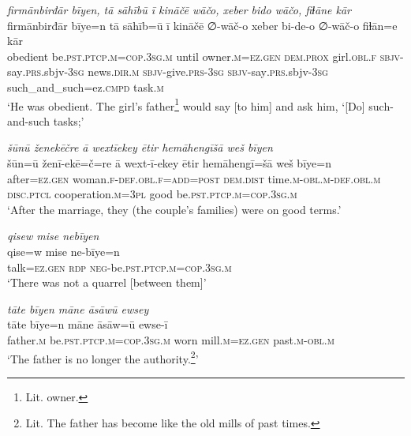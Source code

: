 \ea \label{RE.18}
\textit{firmānbirđār bīyen, tā sāhībū ī kināčē wāčo, xeber bido wāčo, fiɫāne kār} \\ 
\gll firmānbirđār bīye=n tā sāhīb=ū ī kināčē ∅-wāč-o xeber bi-de-o ∅-wāč-o fiɫān=e kār \\ 
 obedient be\textsc{.pst}\textsc{.ptcp}\textsc{.m}\textsc{=cop}\textsc{.3sg}\textsc{.m} until owner\textsc{.m}\textsc{=ez.gen} \textsc{dem.prox} girl\textsc{.obl}\textsc{.f} \textsc{sbjv-}say\textsc{.prs}.sbjv\textsc{-3sg} news\textsc{.dir}\textsc{.m} \textsc{sbjv-}give\textsc{.prs}\textsc{-3sg} \textsc{sbjv-}say\textsc{.prs}.sbjv\textsc{-3sg} such\_and\_such=ez\textsc{.cmpd} task\textsc{.m} \\ 
\glt `He was obedient. The girl’s father\footnote{Lit. owner.} would say [to him] and ask him, ‘[Do] such-and-such tasks;'
\z 
 
\ea \label{RE.22}
\textit{šūnū ženekēčre ā wextīekey ētir hemāhengīšā weš bīyen} \\ 
\gll šūn=ū ženī-ekē=č=re ā wext-ī-ekey ētir hemāhengī=šā weš bīye=n \\ 
 after\textsc{=ez.gen} woman\textsc{.f}\textsc{-def}\textsc{.obl}\textsc{.f}\textsc{=add}\textsc{=\textsc{post}} \textsc{dem.dist} time\textsc{.m}\textsc{-obl}\textsc{.m}\textsc{-def}\textsc{.obl}\textsc{.m} \textsc{disc.ptcl} cooperation\textsc{.m}\textsc{=3pl} good be\textsc{.pst}\textsc{.ptcp}\textsc{.m}\textsc{=cop}\textsc{.3sg}\textsc{.m} \\ 
\glt `After the marriage, they (the couple's families) were on good terms.'
\z 
 
\ea \label{RE.23}
\textit{qisew mise nebīyen} \\ 
\gll qise=w mise ne-bīye=n \\ 
 talk\textsc{=ez.gen} \textsc{rdp} \textsc{neg-}be\textsc{.pst}\textsc{.ptcp}\textsc{.m}\textsc{=cop}\textsc{.3sg}\textsc{.m} \\ 
\glt `There was not a quarrel [between them]'
\z 
 
\ea \label{RE.33}
\textit{tāte bīyen māne āsāwū ewsey} \\ 
\gll tāte bīye=n māne āsāw=ū ewse-ī \\ 
 father\textsc{.m} be\textsc{.pst}\textsc{.ptcp}\textsc{.m}\textsc{=cop}\textsc{.3sg}\textsc{.m} worn mill\textsc{.m}\textsc{=ez.gen} past\textsc{.m}\textsc{-obl}\textsc{.m} \\ 
\glt `The father is no longer the authority.\footnote{Lit. The father has become like the old mills of past times.}'
\z 
 
